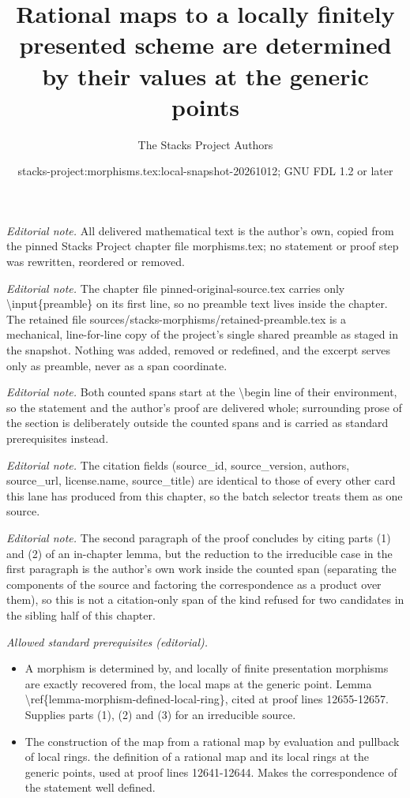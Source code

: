 \documentclass[10pt,a4paper]{amsart}
\title{Rational maps to a locally finitely presented scheme are determined by their values at the generic points}
\author{The Stacks Project Authors}
\date{stacks-project:morphisms.tex:local-snapshot-20261012; GNU FDL 1.2 or later}
\theoremstyle{plain}
\theoremstyle{definition}
\theoremstyle{remark}
\numberwithin{equation}{subsection}
\begin{document}
\maketitle
\setcounter{subsection}{1}
\noindent\textit{Editorial note.} All delivered mathematical text is the author's own, copied from the pinned Stacks Project chapter file morphisms.tex; no statement or proof step was rewritten, reordered or removed.\par\medskip
\noindent\textit{Editorial note.} The chapter file pinned-original-source.tex carries only \textbackslash{}input\{preamble\} on its first line, so no preamble text lives inside the chapter. The retained file sources/stacks-morphisms/retained-preamble.tex is a mechanical, line-for-line copy of the project's single shared preamble as staged in the snapshot. Nothing was added, removed or redefined, and the excerpt serves only as preamble, never as a span coordinate.\par\medskip
\noindent\textit{Editorial note.} Both counted spans start at the \textbackslash{}begin line of their environment, so the statement and the author's proof are delivered whole; surrounding prose of the section is deliberately outside the counted spans and is carried as standard prerequisites instead.\par\medskip
\noindent\textit{Editorial note.} The citation fields (source\_id, source\_version, authors, source\_url, license.name, source\_title) are identical to those of every other card this lane has produced from this chapter, so the batch selector treats them as one source.\par\medskip
\noindent\textit{Editorial note.} The second paragraph of the proof concludes by citing parts (1) and (2) of an in-chapter lemma, but the reduction to the irreducible case in the first paragraph is the author's own work inside the counted span (separating the components of the source and factoring the correspondence as a product over them), so this is not a citation-only span of the kind refused for two candidates in the sibling half of this chapter.\par\medskip
\noindent\textit{Allowed standard prerequisites (editorial).}\begin{itemize}
\item A morphism is determined by, and locally of finite presentation morphisms are exactly recovered from, the local maps at the generic point. Lemma \textbackslash{}ref\{lemma-morphism-defined-local-ring\}, cited at proof lines 12655-12657. Supplies parts (1), (2) and (3) for an irreducible source.
\item The construction of the map from a rational map by evaluation and pullback of local rings. the definition of a rational map and its local rings at the generic points, used at proof lines 12641-12644. Makes the correspondence of the statement well defined.
\end{itemize}\medskip
\end{document}
